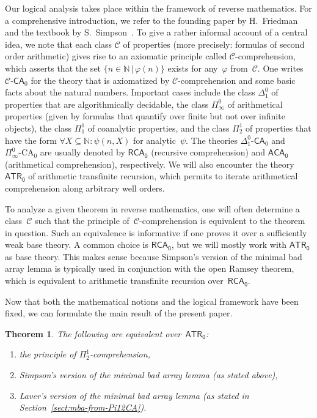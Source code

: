 \documentclass{amsart}
\newtheorem{theorem}{Theorem}
\numberwithin{theorem}{section}
\theoremstyle{definition}
\begin{document}
Our logical analysis takes place within the framework of reverse mathematics. For a comprehensive introduction, we refer to the founding paper by H.~Friedman~\cite{friedman-rm} and the textbook by S.~Simpson~\cite{simpson09}. To give a rather informal account of a central idea, we note that each class $\mathcal C$ of properties (more precisely: formulas of second order arithmetic) gives rise to an axiomatic principle called $\mathcal C$-comprehension, which asserts that the set $\{n\in\mathbb N\,|\,\varphi(n)\}$ exists for any~$\varphi$ from~$\mathcal C$. One writes $\mathcal C\textsf{-CA}_0$ for the theory that is axiomatized by $\mathcal C$-comprehension and some basic facts about the natural numbers. Important cases include the class $\Delta^0_1$ of properties that are algorithmically decidable, the class $\Pi^0_\infty$ of arithmetical properties (given by formulas that quantify over finite but not over infinite objects), the class $\Pi^1_1$ of coanalytic properties, and the class $\Pi^1_2$ of properties that have the form $\forall X\subseteq\mathbb N:\psi(n,X)$ for analytic~$\psi$. The theories $\Delta^0_1\textsf{-CA}_0$ and $\Pi^0_\infty\text{-CA}_0$ are usually denoted by $\mathsf{RCA_0}$ (recursive comprehension) and $\mathsf{ACA_0}$ (arithmetical comprehension), respectively. We will also encounter the theory $\mathsf{ATR_0}$ of arithmetic transfinite recursion, which permits to iterate arithmetical comprehension along arbitrary well orders.

To analyze a given theorem in reverse mathematics, one will often determine a class~$\mathcal C$ such that the principle of~$\mathcal C$-comprehension is equivalent to the theorem in question. Such an equivalence is informative if one proves it over a sufficiently weak base theory. A common choice is $\mathsf{RCA_0}$, but we will mostly work with $\mathsf{ATR_0}$ as base theory. This makes sense because Simpson's version of the minimal bad array lemma is typically used in conjunction with the open Ramsey theorem, which is equivalent to arithmetic transfinite recursion over~$\mathsf{RCA_0}$.

Now that both the mathematical notions and the logical framework have been fixed, we can formulate the main result of the present paper.

\begin{theorem}\label{thm:main}
The following are equivalent over~$\mathsf{ATR_0}$:
\begin{enumerate}[label=(\roman*)]
\item the principle of $\Pi^1_2$-comprehension,
\item Simpson's version of the minimal bad array lemma (as stated above),
\item Laver's version of the minimal bad array lemma (as stated in Section~\ref{sect:mba-from-Pi12CA}).
\end{enumerate}
\end{theorem}
\end{document}
